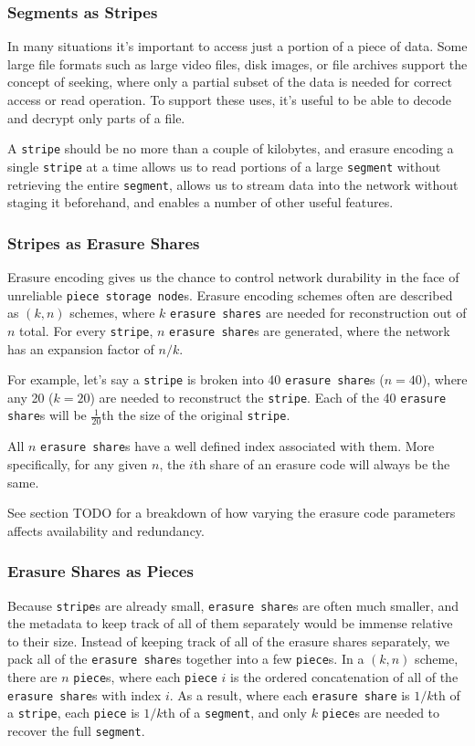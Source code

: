 \documentclass[a4paper,10pt]{article} \usepackage[utf8]{inputenc}
\newcommand{\x}[1]{{\tt #1}} \newcommand{\code}[1]{{\tt #1}}
\newcommand{\todo}[1]{{\color{red} TODO #1 }}
\begin{document}
\subsubsection{Segments as Stripes}

In many situations it's important to access just a portion of a piece of
data. Some large file formats such as large video files, disk images, or file
archives support the concept of seeking,
where only a partial subset of the data is needed for correct access or
read operation. To support these uses,
it's useful to be able to decode and decrypt only parts of a file.

A \x{stripe} should be no more than a couple of kilobytes, and erasure encoding
a single \x{stripe} at a time allows us to read portions of a large \x{segment}
without retrieving the entire \x{segment}, allows us to stream data into the
network without staging it beforehand, and enables a number of other useful
features.

\subsubsection{Stripes as Erasure Shares}

Erasure encoding gives us the chance to control network durability in the face
of unreliable \x{piece storage node}s. Erasure encoding schemes often are
described as $(k, n)$ schemes, where $k$ \x{erasure shares} are needed for
reconstruction out of $n$ total. For every \x{stripe}, $n$ \x{erasure share}s
are generated, where the network has an expansion factor of $n/k$.

For example, let's say a \x{stripe} is broken into 40 \x{erasure share}s
($n=40$), where any 20 ($k=20$) are needed to reconstruct the \x{stripe}. Each
of the 40 \x{erasure share}s will be $\frac{1}{20}$th the size of the original
\x{stripe}.

All $n$ \x{erasure share}s have a well defined index associated
with them. More specifically, for any given $n$, the $i$th share of an erasure
code will always be the same.

See section \todo{} for a breakdown of how varying the erasure code parameters
affects availability and redundancy.

\subsubsection{Erasure Shares as Pieces}

Because \x{stripe}s are already small, \x{erasure share}s are often much
smaller, and the metadata to keep track of all of them separately would be
immense relative to their size. Instead of keeping track of all of the
erasure shares separately, we pack all of the \x{erasure share}s together into
a few \x{piece}s.
In a $(k, n)$ scheme, there are $n$ \x{piece}s, where each
\x{piece} $i$ is the ordered concatenation of all of the \x{erasure share}s with
index $i$. As a result, where each \x{erasure share} is $1/k$th of a
\x{stripe}, each \x{piece} is $1/k$th of a \x{segment}, and only $k$
\x{piece}s are needed to recover the full \x{segment}.
\end{document}

